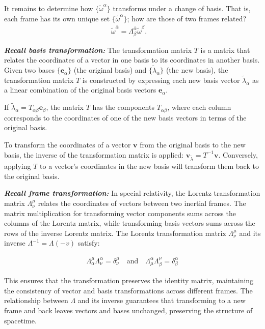 \documentclass[11pt,letterpaper]{book}
\begin{document}
    It remains to determine how \(\{\tilde{\omega}^\alpha\}\) transforms under a change of basis. That is, each frame has its own unique set \(\{\tilde{\omega}^\alpha\}\); how are those of two frames related?
    \begin{align}
    \tilde{\omega}^{\bar{\alpha}} = \Lambda^{\bar{\alpha}}_{\beta} \tilde{\omega}^\beta. \quad \tag{3.13}
    \end{align}

    \textit{\textbf{Recall basis transformation: }} The transformation matrix \( T \) is a matrix that relates the coordinates of a vector in one basis to its coordinates in another basis. Given two bases \(\{\mathbf{e}_\alpha\}\) (the original basis) and \(\{\tilde{\lambda}_\alpha\}\) (the new basis), the transformation matrix \( T \) is constructed by expressing each new basis vector \(\tilde{\lambda}_\alpha\) as a linear combination of the original basis vectors \(\mathbf{e}_\alpha\). 

    If \( \tilde{\lambda}_\alpha = T_{\alpha\beta} \mathbf{e}_\beta \), the matrix \( T \) has the components \( T_{\alpha\beta} \), where each column corresponds to the coordinates of one of the new basis vectors in terms of the original basis. 
        
    To transform the coordinates of a vector \( \mathbf{v} \) from the original basis to the new basis, the inverse of the transformation matrix is applied: \( \mathbf{v}_{\tilde{\lambda}} = T^{-1} \mathbf{v} \). Conversely, applying \( T \) to a vector's coordinates in the new basis will transform them back to the original basis.

    \textbf{\textit{Recall frame transformation:}} In special relativity, the Lorentz transformation matrix \(\Lambda^\mu_\nu\) relates the coordinates of vectors between two inertial frames. The matrix multiplication for transforming vector components sums across the columns of the Lorentz matrix, while transforming basis vectors sums across the rows of the inverse Lorentz matrix. The Lorentz transformation matrix \(\Lambda^\mu_\nu\) and its inverse \(\Lambda^{-1} = \Lambda(-v)\) satisfy:

    \begin{align}
    \Lambda^\mu_\alpha \Lambda^\alpha_\nu = \delta^\mu_\nu
    \quad \text{and} \quad
    \Lambda^\alpha_\mu \Lambda^\mu_\beta = \delta^\alpha_\beta
    \end{align}
    
    This ensures that the transformation preserves the identity matrix, maintaining the consistency of vector and basis transformations across different frames. The relationship between \(\Lambda\) and its inverse guarantees that transforming to a new frame and back leaves vectors and bases unchanged, preserving the structure of spacetime.
\end{document}
